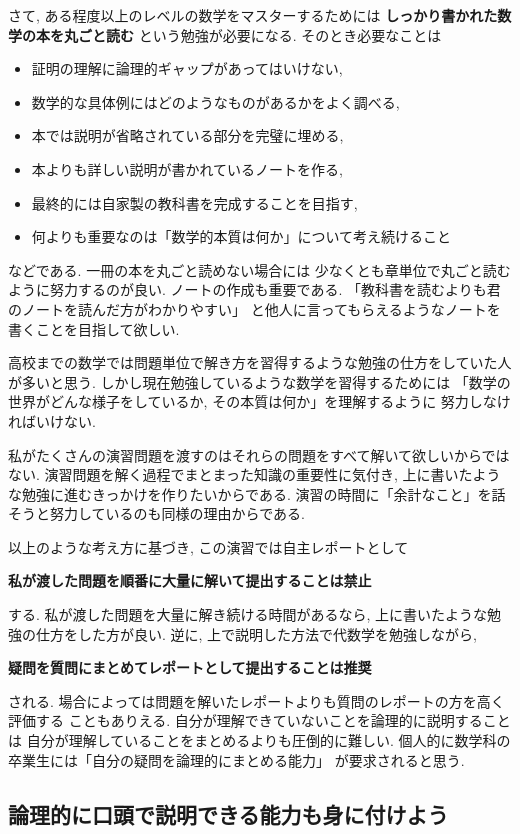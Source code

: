 \documentclass[12pt,twoside]{jarticle}
\begin{document}
さて, ある程度以上のレベルの数学をマスターするためには
{\bf しっかり書かれた数学の本を丸ごと読む}
という勉強が必要になる. そのとき必要なことは
\begin{itemize}
 \item 証明の理解に論理的ギャップがあってはいけない,
 \item 数学的な具体例にはどのようなものがあるかをよく調べる,
 \item 本では説明が省略されている部分を完璧に埋める,
 \item 本よりも詳しい説明が書かれているノートを作る,
 \item 最終的には自家製の教科書を完成することを目指す,
 \item 何よりも重要なのは「数学的本質は何か」について考え続けること
\end{itemize}
などである. 
一冊の本を丸ごと読めない場合には
少なくとも章単位で丸ごと読むように努力するのが良い.
ノートの作成も重要である.
「教科書を読むよりも君のノートを読んだ方がわかりやすい」
と他人に言ってもらえるようなノートを書くことを目指して欲しい.

高校までの数学では問題単位で解き方を習得するような勉強の仕方をしていた人
が多いと思う. しかし現在勉強しているような数学を習得するためには
「数学の世界がどんな様子をしているか, その本質は何か」を理解するように
努力しなければいけない. 

私がたくさんの演習問題を渡すのはそれらの問題をすべて解いて欲しいからでは
ない. 演習問題を解く過程でまとまった知識の重要性に気付き, 
上に書いたような勉強に進むきっかけを作りたいからである.
演習の時間に「余計なこと」を話そうと努力しているのも同様の理由からである.

以上のような考え方に基づき, 
この演習では自主レポートとして
\begin{center}
 \large\bf 私が渡した問題を順番に大量に解いて提出することは禁止
\end{center}
する. 私が渡した問題を大量に解き続ける時間があるなら, 
上に書いたような勉強の仕方をした方が良い.
逆に, 上で説明した方法で代数学を勉強しながら, 
\begin{center}
 \large\bf 疑問を質問にまとめてレポートとして提出することは推奨
\end{center}
される.
場合によっては問題を解いたレポートよりも質問のレポートの方を高く評価する
こともありえる.  自分が理解できていないことを論理的に説明することは
自分が理解していることをまとめるよりも圧倒的に難しい.
個人的に数学科の卒業生には「自分の疑問を論理的にまとめる能力」
が要求されると思う.

\subsection{論理的に口頭で説明できる能力も身に付けよう}
\end{document}
